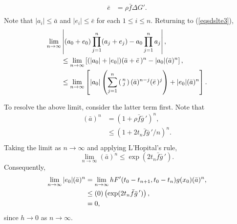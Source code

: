 \begin{prf}
\begin{align*}
\bar{e} &= \rho \bar{f} \Delta G'. \\
\end{align*}
Note that $|a_i| \leq \bar{a}$ and $|e_i| \leq \bar{e}$ for each $1 \leq i \leq
n$. Returning to (\ref{eqsdslte3}),
\begin{align}
  \lim_{n \to \infty}& \left| (a_0 + e_0) \prod_{j=1}^n (a_j +
       e_j)  -  a_0 \prod_{j=1}^{n} a_j \right|, \notag \\
     & \leq \lim_{n \to \infty} \left[ (| a_0| + |e_0|)  (\bar{a} +
       \bar{e}\,)^n  -  | a_0 |  (\bar{a})^n \right], \notag \\
    & \leq \lim_{n \to \infty} \left[ |a_0| \left( \sum_{j=1}^{n} \left(
      \begin{smallmatrix}
       n \\
       j
       \end{smallmatrix}
       \right) (\bar{a})^{n-j} (\bar{e}\,)^j \right) + |e_0| (\bar{a})^n
            \right] \label{eqsdslte4}.
\end{align}

To resolve the above limit, consider the latter term first. Note that
\begin{align*}
  (\bar{a})^n &=  (1 + \rho \bar{f}\bar{g}\,')^n, \\
         &\leq  (1 + 2 t_n \bar{f}\bar{g}\,' / n)^n. \\
\end{align*}
Taking the limit as $n \to \infty$ and applying L'Hopital's rule,
\[ \lim_{n \to \infty} (\bar{a})^n \leq \exp(2 t_n \bar{f}\bar{g}\,'). \]
Consequently,
\begin{align}
  \lim_{n \to \infty} |e_0| (\bar{a})^n &= \lim_{n \to \infty} h F'(t_0 -
          t_{n+1}, t_0 - t_n) g(x_0) (\bar{a})^n, \notag \\
  &\leq  (0) \left( \exp(2 t_n \bar{f} \bar{g}\,') \right), \notag \\
  &= 0, \label{eqsdslte5}
\end{align}
since $h \to 0$ as $n \to \infty$.


\end{prf}
